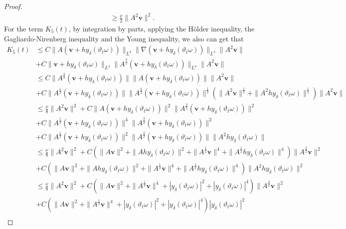 \documentclass{elsarticle}
\theoremstyle{definition}
\numberwithin{equation}{section}
\begin{document}
\begin{proof}
\begin{align}
&\geq\frac\nu2\|A^{2} \textbf{v}\|^2.
\end{align}
For the term $K_5(t)$,  by integration by parts, applying the H\"{o}lder inequality, the Gagliardo-Nirenberg inequality and the Young inequality, we also can get that
\begin{align}\label{6.9}
K_5(t)&\leq C\|A(\textbf{v}+hy_\delta(\vartheta_t\omega))\|_{L^4}\|\nabla(\textbf{v}+hy_\delta(\vartheta_t\omega))\|_{L^4}
\|A^{2}\textbf{v}\|\nonumber\\
&+C\|\textbf{v}+hy_\delta(\vartheta_t\omega)\|_{L^4}\|A^\frac32(\textbf{v}+hy_\delta(\vartheta_t\omega))\|_{L^4}
\|A^{2}\textbf{v}\|\nonumber\\
&\leq C\|A^{\frac{3}{2}}(\textbf{v}+hy_\delta(\vartheta_t\omega))\|\|A(\textbf{v}+hy_\delta(\vartheta_t\omega))\|
\|A^{2}\textbf{v}\|\nonumber\\
&+C\|A^{\frac{1}{2}}(\textbf{v}+hy_\delta(\vartheta_t\omega))\|\|A^\frac32(\textbf{v}+hy_\delta(\vartheta_t\omega))\|^\frac12
(\|A^2\textbf{v}\|^\frac12+\|A^2hy_\delta(\vartheta_t\omega)\|^\frac12)\|A^{2}\textbf{v}\|\nonumber\\
&\leq \frac\nu8\|A^{2}\textbf{v}\|^2
+C\|A(\textbf{v}+hy_\delta(\vartheta_t\omega))\|^2\|A^{\frac{3}{2}}(\textbf{v}+hy_\delta(\vartheta_t\omega))\|^2\nonumber\\
&+C\|A^{\frac{1}{2}}(\textbf{v}+hy_\delta(\vartheta_t\omega))\|^4\|A^\frac32(\textbf{v}+hy_\delta(\vartheta_t\omega))\|^2
\nonumber\\
&+C\|A^{\frac{1}{2}}(\textbf{v}+hy_\delta(\vartheta_t\omega))\|^2\|A^\frac32(\textbf{v}+hy_\delta(\vartheta_t\omega))\|
\|A^2hy_\delta(\vartheta_t\omega)\|
\nonumber\\
&\leq \frac\nu8\|A^{2}\textbf{v}\|^2
+C(\|A\textbf{v}\|^2+\|Ahy_\delta(\vartheta_t\omega)\|^2
+\|A^{\frac{1}{2}}\textbf{v}\|^4+\|A^{\frac{1}{2}}hy_\delta(\vartheta_t\omega)\|^4)\|A^\frac32\textbf{v}\|^2
\nonumber\\
&+C(\|A\textbf{v}\|^2+\|Ahy_\delta(\vartheta_t\omega)\|^2
+\|A^{\frac{1}{2}}\textbf{v}\|^4+\|A^{\frac{1}{2}}hy_\delta(\vartheta_t\omega)\|^4)\|A^2hy_\delta(\vartheta_t\omega)\|^2
\nonumber\\
&\leq \frac\nu8\|A^{2}\textbf{v}\|^2
+C(\|A\textbf{v}\|^2
+\|A^{\frac{1}{2}}\textbf{v}\|^4+|y_\delta(\vartheta_t\omega)|^2+|y_\delta(\vartheta_t\omega)|^4)\|A^\frac32\textbf{v}\|^2
\nonumber\\
&+C(\|A\textbf{v}\|^2+\|A^{\frac{1}{2}}\textbf{v}\|^4+|y_\delta(\vartheta_t\omega)|^2
+|y_\delta(\vartheta_t\omega)|^4)|y_\delta(\vartheta_t\omega)|^2\nonumber\\

\end{align}
\end{proof}
\end{document}
